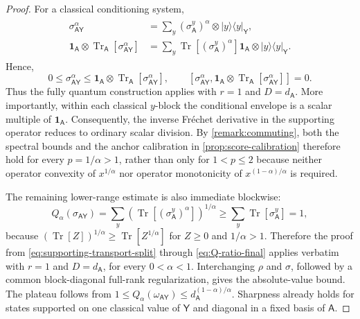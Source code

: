 \documentclass[11pt,reqno]{amsart}
\theoremstyle{definition}
\newtheorem{remark}[remark]{Remark}
\DeclareMathOperator{\Tr}{Tr}
\newcommand{\I}{\mathbf 1}
\newcommand{\A}{\mathsf{A}}
\newcommand{\Y}{\mathsf{Y}}
\begin{document}
\begin{proof}
	For a classical conditioning system,
	\begin{align}
		\begin{split}
		\sigma_{\A\Y}^{\alpha}
		&=
		\sum_y(\sigma_{\A}^{y})^\alpha
		\otimes|y\rangle\!\langle y|_{\Y},
		\\
		\I_{\A}\otimes\Tr_{\A}[\sigma_{\A\Y}^{\alpha}]
		&=
		\sum_y
		\Tr[(\sigma_{\A}^{y})^\alpha]\I_{\A}
		\otimes|y\rangle\!\langle y|_{\Y}.
		\label{eq:classical-blocks}
		\end{split}
	\end{align}
	Hence,
	\[
	0\leq\sigma_{\A\Y}^{\alpha}
	\leq
	\I_{\A}\otimes\Tr_{\A}[\sigma_{\A\Y}^{\alpha}],
	\qquad
	\left[
	\sigma_{\A\Y}^{\alpha},
	\I_{\A}\otimes\Tr_{\A}[\sigma_{\A\Y}^{\alpha}]
	\right]=0.
	\]
	Thus the fully quantum construction applies with \(r=1\) and
	\(D=d_{\A}\).  More importantly, within each classical \(y\)-block the
	conditional envelope is a scalar multiple of \(\I_{\A}\).  Consequently,
	the inverse Fr\'echet derivative in the supporting operator reduces to
	ordinary scalar division.  By \cref{remark:commuting}, both the spectral bounds and the anchor calibration in
	\cref{prop:score-calibration} therefore hold for every
	\(p=1/\alpha>1\), rather than only for \(1<p\leq2\) because  neither operator convexity of
	$x^{1/\alpha}$ nor operator monotonicity of
	$x^{(1-\alpha)/\alpha}$ is required.
	
	The remaining lower-range estimate is also immediate blockwise:
	\[
	Q_\alpha(\sigma_{\A\Y})
	=
	\sum_y
	\left(\Tr[(\sigma_{\A}^{y})^\alpha]\right)^{1/\alpha}
	\geq
	\sum_y\Tr[\sigma_{\A}^{y}]
	=1,
	\]
	because
	\(
	(\Tr [Z])^{1/\alpha}\geq\Tr[Z^{1/\alpha}]
	\)
	for \(Z\geq0\) and \(1/\alpha>1\).
	Therefore the proof from
	\cref{eq:supporting-transport-split} through
	\cref{eq:Q-ratio-final} applies verbatim with \(r=1\) and
	\(D=d_{\A}\), for every \(0<\alpha<1\).
	Interchanging \(\rho\) and
	\(\sigma\), followed by a common block-diagonal full-rank
	regularization, gives the absolute-value bound.  
	The plateau follows from
    $1\leq Q_\alpha(\omega_{\A\Y})
    \leq d_{\A}^{(1-\alpha)/\alpha}$.
    Sharpness already holds for states supported on one classical value of
    $\Y$ and diagonal in a fixed basis of $\A$.
\end{proof}

\end{document}

